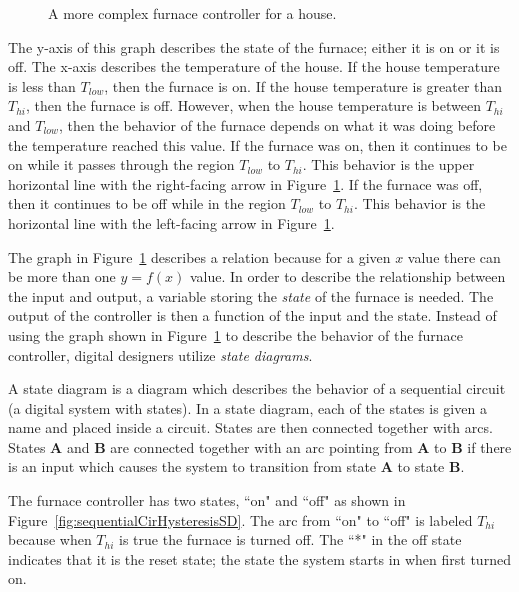 \begin{figure}[ht]
    \caption{A more complex furnace controller for a house.}
    \label{fig:sequentialCirHysteresisGraph}
\end{figure}

The y-axis of this graph describes the state of the furnace; either it is
on or it is off.  The x-axis describes the temperature of the house.  If the
house temperature is less than $T_{low}$, then the furnace is on.  If the
house temperature is greater than $T_{hi}$, then the furnace is off.  However,
when the house temperature is between $T_{hi}$ and $T_{low}$, then the
behavior of the furnace depends on what it was doing before the
temperature reached this value.  If the furnace was on, then it continues
to be on while it passes through the region $T_{low}$ to $T_{hi}$. This behavior
is the upper horizontal line with the right-facing arrow in
Figure~\ref{fig:sequentialCirHysteresisGraph}.  If the furnace was off, then it continues
to be off while in the region $T_{low}$ to $T_{hi}$.  This behavior is the
horizontal line with the left-facing arrow in Figure~\ref{fig:sequentialCirHysteresisGraph}.

The graph in Figure~\ref{fig:sequentialCirHysteresisGraph} describes a relation because
for a given $x$ value there can be more than one $y=f(x)$ value.  In order to
describe the relationship between the input and output, a variable
storing the \textit{ state} of the furnace is needed.  The output of the controller
is then a function of the input and the state.  Instead of using the graph
shown in Figure~\ref{fig:sequentialCirHysteresisGraph} to describe the behavior of the
furnace controller, digital designers utilize \textit{ state diagrams}.

A state diagram is a diagram which describes the behavior of a sequential
circuit (a digital system with states).  In a state diagram, each of the
states is given a name and placed inside a circuit.  States are then
connected together with arcs. States \textbf{ A} and \textbf{ B} are connected together
with an arc pointing from \textbf{ A} to \textbf{ B} if there is an input which causes
the system to transition from state \textbf{ A} to state \textbf{ B}.

The furnace controller has two states, ``on" and ``off" as shown in
Figure~\ref{fig:sequentialCirHysteresisSD}.  The arc from ``on" to ``off" is labeled
$T_{hi}$ because when $T_{hi}$ is true the furnace is turned off.
The ``*" in the off state indicates that it is the reset state; the
state the system starts in when first turned on.

